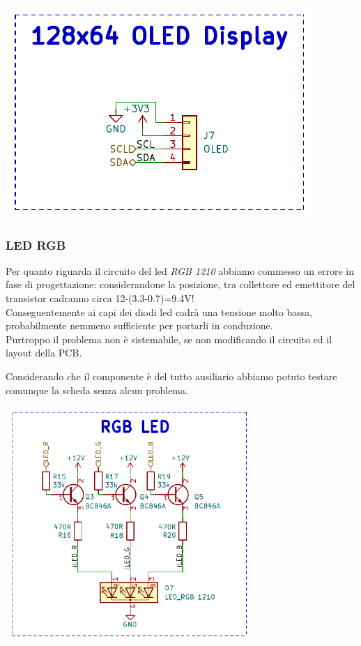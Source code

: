 \begin{center}
\includegraphics[scale=0.7]{figures/image58.png}
\captionsetup{type=figure}
\end{center}

\hypertarget{led-rgb}{%
\subsubsection{\texorpdfstring{\hfill\break
\hfill\break
LED RGB}{  LED RGB}}\label{led-rgb}}

Per quanto riguarda il circuito del led \emph{RGB 1210} abbiamo commesso
un errore in fase di progettazione: considerandone la posizione, tra
collettore ed emettitore del transistor cadranno circa
12-(3.3-0.7)=9.4V!\\
Conseguentemente ai capi dei diodi led cadrà una tensione molto bassa,
probabilmente nemmeno sufficiente per portarli in conduzione.\\
Purtroppo il problema non è sistemabile, se non modificando il circuito
ed il layout della PCB.

Considerando che il componente è del tutto ausiliario abbiamo potuto
testare comunque la scheda senza alcun problema.

\begin{center}
\includegraphics[width=3.68946in,height=3.49479in]{figures/image17.png}
\captionsetup{type=figure}
\end{center}


